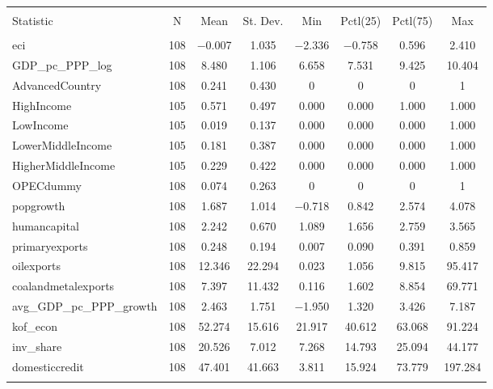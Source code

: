 
\begin{tabular}{@{\extracolsep{5pt}}lccccccc} 
\\[-1.8ex]\hline 
\hline \\[-1.8ex] 
Statistic & \multicolumn{1}{c}{N} & \multicolumn{1}{c}{Mean} & \multicolumn{1}{c}{St. Dev.} & \multicolumn{1}{c}{Min} & \multicolumn{1}{c}{Pctl(25)} & \multicolumn{1}{c}{Pctl(75)} & \multicolumn{1}{c}{Max} \\ 
\hline \\[-1.8ex] 
eci & 108 & $-$0.007 & 1.035 & $-$2.336 & $-$0.758 & 0.596 & 2.410 \\ 
GDP\_pc\_PPP\_log & 108 & 8.480 & 1.106 & 6.658 & 7.531 & 9.425 & 10.404 \\ 
AdvancedCountry & 108 & 0.241 & 0.430 & 0 & 0 & 0 & 1 \\ 
HighIncome & 105 & 0.571 & 0.497 & 0.000 & 0.000 & 1.000 & 1.000 \\ 
LowIncome & 105 & 0.019 & 0.137 & 0.000 & 0.000 & 0.000 & 1.000 \\ 
LowerMiddleIncome & 105 & 0.181 & 0.387 & 0.000 & 0.000 & 0.000 & 1.000 \\ 
HigherMiddleIncome & 105 & 0.229 & 0.422 & 0.000 & 0.000 & 0.000 & 1.000 \\ 
OPECdummy & 108 & 0.074 & 0.263 & 0 & 0 & 0 & 1 \\ 
popgrowth & 108 & 1.687 & 1.014 & $-$0.718 & 0.842 & 2.574 & 4.078 \\ 
humancapital & 108 & 2.242 & 0.670 & 1.089 & 1.656 & 2.759 & 3.565 \\ 
primaryexports & 108 & 0.248 & 0.194 & 0.007 & 0.090 & 0.391 & 0.859 \\ 
oilexports & 108 & 12.346 & 22.294 & 0.023 & 1.056 & 9.815 & 95.417 \\ 
coalandmetalexports & 108 & 7.397 & 11.432 & 0.116 & 1.602 & 8.854 & 69.771 \\ 
avg\_GDP\_pc\_PPP\_growth & 108 & 2.463 & 1.751 & $-$1.950 & 1.320 & 3.426 & 7.187 \\ 
kof\_econ & 108 & 52.274 & 15.616 & 21.917 & 40.612 & 63.068 & 91.224 \\ 
inv\_share & 108 & 20.526 & 7.012 & 7.268 & 14.793 & 25.094 & 44.177 \\ 
domesticcredit & 108 & 47.401 & 41.663 & 3.811 & 15.924 & 73.779 & 197.284 \\ 
\hline \\[-1.8ex] 
\end{tabular} 

